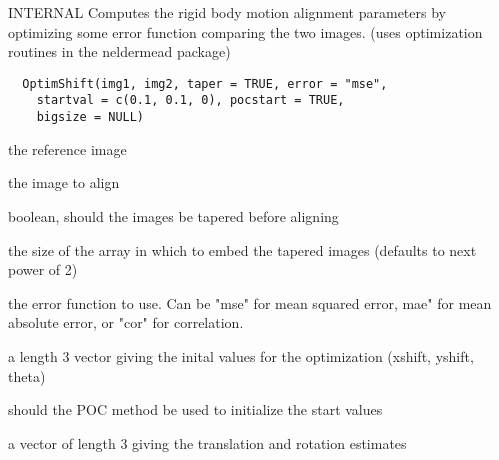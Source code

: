 \documentclass[a4paper]{book}
\begin{document}
%
\begin{Description}\relax
INTERNAL Computes the rigid body motion alignment
parameters by optimizing some error function comparing
the two images. (uses optimization routines in the
neldermead package)
\end{Description}
%
\begin{Usage}
\begin{verbatim}
  OptimShift(img1, img2, taper = TRUE, error = "mse",
    startval = c(0.1, 0.1, 0), pocstart = TRUE,
    bigsize = NULL)
\end{verbatim}
\end{Usage}
%
\begin{Arguments}
\begin{ldescription}
\item[\code{img1}] the reference image

\item[\code{img2}] the image to align

\item[\code{taper}] boolean, should the images be tapered before
aligning

\item[\code{bigsize}] the size of the array in which to embed
the tapered images (defaults to next power of 2)

\item[\code{error}] the error function to use. Can be "mse" for
mean squared error, mae" for mean absolute error, or
"cor" for correlation.

\item[\code{startval}] a length 3 vector giving the inital
values for the optimization (xshift, yshift, theta)

\item[\code{pocstart}] should the POC method be used to
initialize the start values
\end{ldescription}
\end{Arguments}
%
\begin{Value}
a vector of length 3 giving the translation and rotation
estimates
\end{Value}
\end{document}
